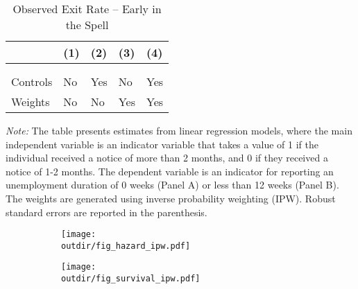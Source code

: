 \documentclass{div}
\newcommand{\outdir}{./../output}
\begin{document}
\begin{table}[t]
\begin{threeparttable}
\caption{Observed Exit Rate -- Early in the Spell}\label{tab_init_hazard}
\begin{tabularx}{\textwidth}{p{}YYYY}
\toprule
& (1) & (2) & (3) & (4) \\
\midrule \addlinespace[1ex]
 \\ \addlinespace[2ex]
 \addlinespace[3ex]
 \\ \addlinespace[2ex]
 \addlinespace[2ex]
Controls   &  No & Yes  & No & Yes \\
Weights   & No  & No   & Yes & Yes \\
\midrule

\bottomrule
\end{tabularx}
\begin{tablenotes}
\item \textit{Note:} The table presents estimates from linear regression models, where the main independent variable is an indicator variable that takes a value of 1 if the individual received a notice of more than 2 months, and 0 if they received a notice of 1-2 months. The dependent variable is an indicator for reporting an unemployment duration of 0 weeks (Panel A) or less than 12 weeks (Panel B). The weights are generated using inverse probability weighting (IPW). Robust standard errors are reported in the parenthesis. 
\end{tablenotes}
\end{threeparttable}
\end{table}

\begin{figure}[t]\caption{Exit and Survival Rate --- Later in the Spell}
\vspace{-0.5em}
\centering
\begin{subfigure}{.525\textwidth}
\centering
\texttt{[image: \\outdir/fig\_hazard\_ipw.pdf]}
\end{subfigure}
\begin{subfigure}{.45\textwidth}
\centering
\texttt{[image: \\outdir/fig\_survival\_ipw.pdf]}
\end{subfigure}
\vspace{-0.75em}
\end{figure}
\end{document}
